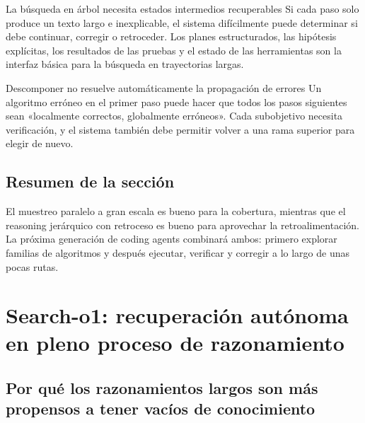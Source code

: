\documentclass[a4paper]{article}
\begin{document}
\begin{importantbox}{La búsqueda en árbol necesita estados intermedios recuperables}
Si cada paso solo produce un texto largo e inexplicable, el sistema difícilmente puede determinar si debe continuar, corregir o retroceder. Los planes estructurados, las hipótesis explícitas, los resultados de las pruebas y el estado de las herramientas son la interfaz básica para la búsqueda en trayectorias largas.
\end{importantbox}

\begin{warningbox}{Descomponer no resuelve automáticamente la propagación de errores}
Un algoritmo erróneo en el primer paso puede hacer que todos los pasos siguientes sean «localmente correctos, globalmente erróneos». Cada subobjetivo necesita verificación, y el sistema también debe permitir volver a una rama superior para elegir de nuevo.
\end{warningbox}

\subsection{Resumen de la sección}

El muestreo paralelo a gran escala es bueno para la cobertura, mientras que el reasoning jerárquico con retroceso es bueno para aprovechar la retroalimentación. La próxima generación de coding agents combinará ambos: primero explorar familias de algoritmos y después ejecutar, verificar y corregir a lo largo de unas pocas rutas.
\section{Search-o1: recuperación autónoma en pleno proceso de razonamiento}

\subsection{Por qué los razonamientos largos son más propensos a tener vacíos de conocimiento}


\end{document}

